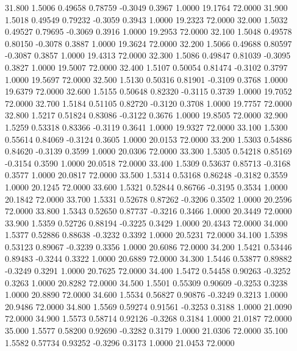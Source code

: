   31.800   1.5006   0.49658   0.78759  -0.3049   0.3967   1.0000  19.1764  72.0000
  31.900   1.5018   0.49549   0.79232  -0.3059   0.3943   1.0000  19.2323  72.0000
  32.000   1.5032   0.49527   0.79695  -0.3069   0.3916   1.0000  19.2953  72.0000
  32.100   1.5048   0.49578   0.80150  -0.3078   0.3887   1.0000  19.3624  72.0000
  32.200   1.5066   0.49688   0.80597  -0.3087   0.3857   1.0000  19.4313  72.0000
  32.300   1.5086   0.49847   0.81039  -0.3095   0.3827   1.0000  19.5007  72.0000
  32.400   1.5107   0.50054   0.81474  -0.3102   0.3797   1.0000  19.5697  72.0000
  32.500   1.5130   0.50316   0.81901  -0.3109   0.3768   1.0000  19.6379  72.0000
  32.600   1.5155   0.50648   0.82320  -0.3115   0.3739   1.0000  19.7052  72.0000
  32.700   1.5184   0.51105   0.82720  -0.3120   0.3708   1.0000  19.7757  72.0000
  32.800   1.5217   0.51824   0.83086  -0.3122   0.3676   1.0000  19.8505  72.0000
  32.900   1.5259   0.53318   0.83366  -0.3119   0.3641   1.0000  19.9327  72.0000
  33.100   1.5300   0.55614   0.84069  -0.3124   0.3605   1.0000  20.0153  72.0000
  33.200   1.5303   0.54886   0.84620  -0.3139   0.3599   1.0000  20.0306  72.0000
  33.300   1.5305   0.54218   0.85169  -0.3154   0.3590   1.0000  20.0518  72.0000
  33.400   1.5309   0.53637   0.85713  -0.3168   0.3577   1.0000  20.0817  72.0000
  33.500   1.5314   0.53168   0.86248  -0.3182   0.3559   1.0000  20.1245  72.0000
  33.600   1.5321   0.52844   0.86766  -0.3195   0.3534   1.0000  20.1842  72.0000
  33.700   1.5331   0.52678   0.87262  -0.3206   0.3502   1.0000  20.2596  72.0000
  33.800   1.5343   0.52650   0.87737  -0.3216   0.3466   1.0000  20.3449  72.0000
  33.900   1.5359   0.52726   0.88194  -0.3225   0.3429   1.0000  20.4343  72.0000
  34.000   1.5377   0.52886   0.88638  -0.3232   0.3392   1.0000  20.5231  72.0000
  34.100   1.5398   0.53123   0.89067  -0.3239   0.3356   1.0000  20.6086  72.0000
  34.200   1.5421   0.53446   0.89483  -0.3244   0.3322   1.0000  20.6889  72.0000
  34.300   1.5446   0.53877   0.89882  -0.3249   0.3291   1.0000  20.7625  72.0000
  34.400   1.5472   0.54458   0.90263  -0.3252   0.3263   1.0000  20.8282  72.0000
  34.500   1.5501   0.55309   0.90609  -0.3253   0.3238   1.0000  20.8890  72.0000
  34.600   1.5534   0.56827   0.90876  -0.3249   0.3213   1.0000  20.9486  72.0000
  34.800   1.5569   0.59274   0.91561  -0.3253   0.3188   1.0000  21.0090  72.0000
  34.900   1.5573   0.58714   0.92126  -0.3268   0.3184   1.0000  21.0187  72.0000
  35.000   1.5577   0.58200   0.92690  -0.3282   0.3179   1.0000  21.0306  72.0000
  35.100   1.5582   0.57734   0.93252  -0.3296   0.3173   1.0000  21.0453  72.0000
